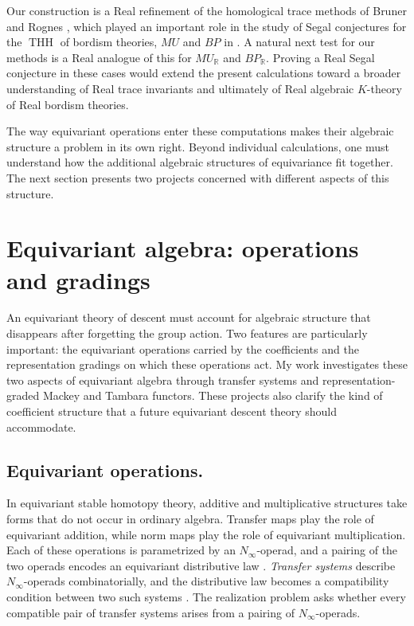 \documentclass[11pt]{article}
\newcommand{\THH}{\operatorname{THH}}
\begin{document}
Our construction is a Real refinement of the homological trace methods of Bruner and Rognes \cite{MR2153113}, which played an important role in the study of Segal conjectures for the $\THH$ of bordism theories, $MU$ and $BP$ in \cite{MR2832570}.
A natural next test for our methods is a Real analogue of this for $MU_{\mathbb R}$ and $BP_{\mathbb R}$.
Proving a Real Segal conjecture in these cases would extend the present calculations toward a broader understanding of Real trace invariants and ultimately of Real algebraic $K$-theory of Real bordism theories.

The way equivariant operations enter these computations makes their algebraic structure a problem in its own right.
Beyond individual calculations, one must understand how the additional algebraic structures of equivariance fit together. 
The next section presents two projects concerned with different aspects of this structure.

\section{Equivariant algebra: operations and gradings}
An equivariant theory of descent must account for algebraic structure that disappears after forgetting the group action.
Two features are particularly important: the equivariant operations carried by the coefficients and the representation gradings on which these operations act.
My work investigates these two aspects of equivariant algebra through transfer systems and representation-graded Mackey and Tambara functors.
These projects also clarify the kind of coefficient structure that a future equivariant descent theory should accommodate.

\subsection{Equivariant operations.}
In equivariant stable homotopy theory, additive and multiplicative structures take forms that do not occur in ordinary algebra.
Transfer maps play the role of equivariant addition, while norm maps play the role of equivariant multiplication. 
Each of these operations is parametrized by an \(N_\infty\)-operad, and a pairing of the two operads encodes an equivariant distributive law \cite{MR4327103}. 
\emph{Transfer systems} describe \(N_\infty\)-operads combinatorially, and the distributive law becomes a compatibility condition between two such systems \cite{MR4244201}.
The realization problem asks whether every compatible pair of transfer systems arises from a pairing of \(N_\infty\)-operads.
\end{document}
